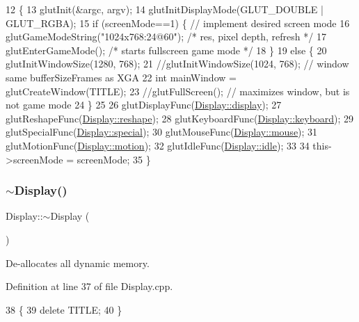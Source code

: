 \begin{DoxyCode}
12 \{
13   glutInit(&argc, argv);
14   glutInitDisplayMode(GLUT\_DOUBLE | GLUT\_RGBA);
15   \textcolor{keywordflow}{if} (screenMode==1) \{  \textcolor{comment}{// implement desired screen mode}
16     glutGameModeString(\textcolor{stringliteral}{"1024x768:24@60"});  \textcolor{comment}{/* res, pixel depth, refresh */}
17     glutEnterGameMode();  \textcolor{comment}{/* starts fullscreen game mode */}
18   \}
19   \textcolor{keywordflow}{else} \{
20     glutInitWindowSize(1280, 768);
21     \textcolor{comment}{//glutInitWindowSize(1024, 768);  // window same bufferSizeFrames as XGA}
22     \textcolor{keywordtype}{int} mainWindow = glutCreateWindow(TITLE);
23     \textcolor{comment}{//glutFullScreen();    // maximizes window, but is not game mode}
24   \}
25 
26   glutDisplayFunc(\mbox{\hyperlink{classDisplay_aa3ab70ec7b76fa3ed139d19e53e72283}{Display::display}});
27   glutReshapeFunc(\mbox{\hyperlink{classDisplay_a655b5e6c69cae3a1b45388448e9064e4}{Display::reshape}});
28   glutKeyboardFunc(\mbox{\hyperlink{classDisplay_a534c28d5e7287ad3e98106a6d8105e68}{Display::keyboard}});
29   glutSpecialFunc(\mbox{\hyperlink{classDisplay_ad973a37817adac76ae9373dc4f5ba22b}{Display::special}});
30   glutMouseFunc(\mbox{\hyperlink{classDisplay_a711fdd8ee2c30e8e54d2883ae3e1bbf8}{Display::mouse}});
31   glutMotionFunc(\mbox{\hyperlink{classDisplay_a56b5e2138938b063f81e83ad9ed4dae3}{Display::motion}});
32   glutIdleFunc(\mbox{\hyperlink{classDisplay_aee4bd8d62d2911a938523339630a4357}{Display::idle}});
33 
34   this->screenMode = screenMode;
35 \}
\end{DoxyCode}
\mbox{\label{classDisplay_ac2607a6bb236c55547a4223d40d85d1f}} 
\subsubsection{\texorpdfstring{$\sim$\+Display()}{~Display()}}
{\footnotesize\ttfamily Display\+::$\sim$\+Display (\begin{DoxyParamCaption}{ }\end{DoxyParamCaption})}

De-\/allocates all dynamic memory. 

Definition at line 37 of file Display.\+cpp.


\begin{DoxyCode}
38 \{
39   \textcolor{keyword}{delete} TITLE;
40 \}
\end{DoxyCode}


